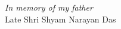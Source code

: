 \doublespacing
\clearpage
\thispagestyle{empty}
\begin{center}
\vspace*{250px}
\textit{In memory of my father}\\
 Late Shri Shyam Narayan Das
\end{center}

\restoregeometry